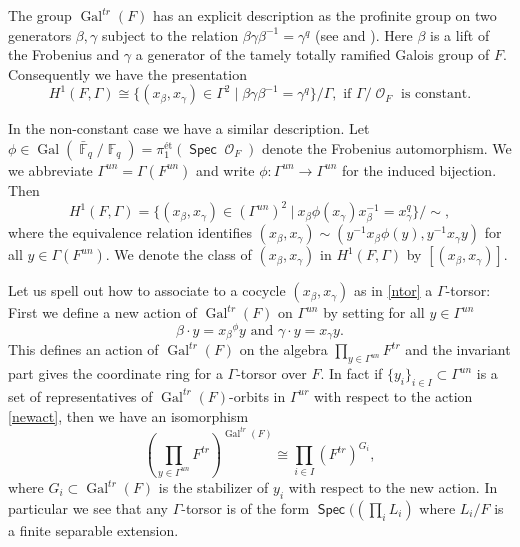 \documentclass{article}
\DeclareMathOperator{\Fb}{\mathbb{F}}
\DeclareMathOperator{\Gal}{Gal}
\DeclareMathOperator{\Spec}{\mathsf{Spec}}
\DeclareMathOperator{\Oo}{\mathcal{O}}
\theoremstyle{definition}
\theoremstyle{plain}
\begin{document}
The group $ \Gal^{tr}(F)$ has an explicit description as the profinite group on two generators $\beta, \gamma$ subject to the relation $\beta\gamma \beta^{-1} = \gamma^q$ (see \cite{Hasse} and \cite{Iwasawa}). Here $\beta$ is a lift of the Frobenius and $\gamma$ a generator of the tamely totally ramified Galois group of $F$. Consequently we have the presentation
\begin{equation*}H^1(F,\Gamma) \cong\{ (x_\beta,x_\gamma) \in \Gamma^2 \mid  \beta\gamma \beta^{-1} = \gamma^q\}/\Gamma, \text{ if $\Gamma/\Oo_F$ is constant.} \end{equation*}

In the non-constant case we have a similar description. Let $\phi \in \Gal(\bar{\Fb}_q/\Fb_q) = \pi_1^{\text{\'et}}(\Spec \Oo_F)$ denote the Frobenius automorphism. We we abbreviate $\Gamma^{un} = \Gamma(F^{un})$ and  write $\phi\colon \Gamma^{un} \to \Gamma^{un}$ for the induced bijection.
Then
\begin{equation}\label{ntor} H^1(F,\Gamma) = \{(x_{\beta},x_{\gamma}) \in( \Gamma^{un})^2 \ | \ x_{\beta}\phi(x_{\gamma})x_{\beta}^{-1} = x_{\gamma}^q \} / \sim{},\end{equation}
where the equivalence relation identifies $(x_{\beta},x_{\gamma}) \sim{} (y^{-1}x_{\beta}\phi(y),y^{-1}x_{\gamma}y)$ for all $y \in \Gamma(F^{un})$. We denote the class of $(x_\beta,x_\gamma)$ in $H^1(F,\Gamma)$ by $[(x_\beta,x_\gamma)]$.

Let us spell out how to associate to a cocycle $(x_\beta,x_\gamma)$ as in \eqref{ntor} a $\Gamma$-torsor: First we define a new action of $\Gal^{tr}(F)$ on $\Gamma^{un}$ by setting for all $y \in \Gamma^{un}$
\begin{equation}\label{newact} \beta \cdot y = x_\beta {}^\phi y \text{ and } \gamma \cdot y = x_\gamma y. \end{equation}
This defines an action of $\Gal^{tr}(F)$ on the algebra $\prod_{y \in \Gamma^{un}} F^{tr}$ and the invariant part gives the coordinate ring for a $\Gamma$-torsor over $F$. In fact if $\{y_i\}_{i\in I} \subset \Gamma^{un}$ is a set of representatives of  $\Gal^{tr}(F)$-orbits in $\Gamma^{ur}$ with respect to the action \eqref{newact}, then we have an isomorphism
\begin{equation}\label{invexp}   \left(  \prod_{y \in \Gamma^{un}} F^{tr}  \right)^{\Gal^{tr}(F)}   \cong \prod_{i\in I} \left( F^{tr} \right)^{G_i},    \end{equation}
where $G_i \subset \Gal^{tr}(F)$ is the stabilizer of $y_i$ with respect to the new action. In particular we see that any $\Gamma$-torsor is of the form $\Spec(\left( \prod_i L_i   \right)$ where $L_i/F$ is a finite separable extension.
\end{document}
